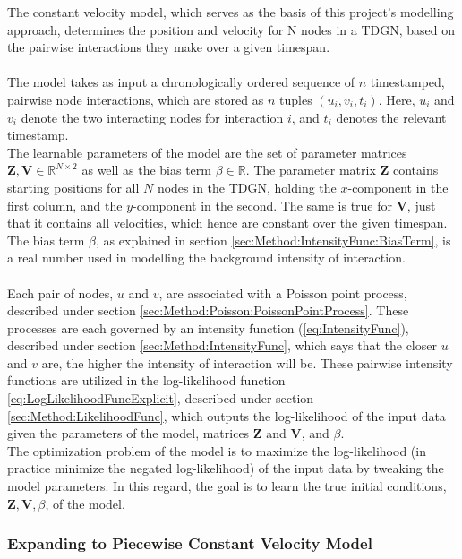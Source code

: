 The constant velocity model, which serves as the basis of this project's modelling approach, determines the position and velocity for N nodes in a TDGN, based on the pairwise interactions they make over a given timespan.
\\\\
The model takes as input a chronologically ordered sequence of $n$ timestamped, pairwise node interactions, which are stored as $n$ tuples $(u_i, v_i, t_i)$.
Here, $u_i$ and $v_i$ denote the two interacting nodes for interaction $i$, and $t_i$ denotes the relevant timestamp.
\\
The learnable parameters of the model are the set of parameter matrices $\textbf{Z}, \textbf{V} \in \mathbb{R} ^{N \times 2}$ as well as the bias term $\beta \in \mathbb{R}$.
The parameter matrix $\textbf{Z}$ contains starting positions for all $N$ nodes in the TDGN, holding the $x$-component in the first column, and the $y$-component in the second.
The same is true for $\textbf{V}$, just that it contains all velocities, which hence are constant over the given timespan.
The bias term $\beta$, as explained in section \ref{sec:Method:IntensityFunc:BiasTerm}, is a real number used in modelling the background intensity of interaction.
\\\\
Each pair of nodes, $u$ and $v$, are associated with a Poisson point process, described under section \ref{sec:Method:Poisson:PoissonPointProcess}.
These processes are each governed by an intensity function (\ref{eq:IntensityFunc}), described under section \ref{sec:Method:IntensityFunc}, which says that the closer $u$ and $v$ are, the higher the intensity of interaction will be. 
These pairwise intensity functions are utilized in the log-likelihood function \ref{eq:LogLikelihoodFuncExplicit}, described under section \ref{sec:Method:LikelihoodFunc}, which outputs the log-likelihood of the input data given the parameters of the model, matrices $\textbf{Z}$ and $\textbf{V}$, and $\beta$.
\\
The optimization problem of the model is to maximize the log-likelihood (in practice minimize the negated log-likelihood) of the input data by tweaking the model parameters.
In this regard, the goal is to learn the true initial conditions, $\textbf{Z}, \textbf{V}, \beta$, of the model.


\subsubsection{Expanding to Piecewise Constant Velocity Model}
\label{sec:Method:PiecewiseConstantVModel:PiecewiseConstantVelocityModel}

